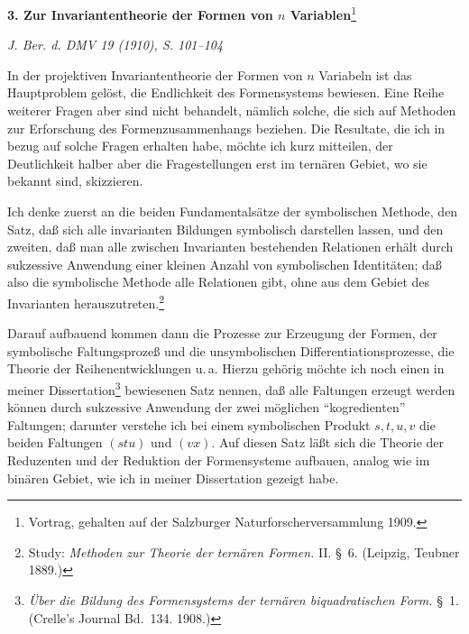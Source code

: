 \documentclass[12pt,a4paper]{article}
\begin{document}
\renewenvironment{noetherpaper}[4]{\newpage\section*{#1}\addcontentsline{toc}{section}{#1}\par\smallskip}{\par\medskip}




\begin{center}
\textbf{3. Zur Invariantentheorie der Formen von $n$ Variablen}\footnote{Vortrag, gehalten auf der Salzburger Naturforscherversammlung 1909.}

\smallskip
\textit{J. Ber. d. DMV 19 (1910), S. 101--104}
\end{center}

\smallskip

In der projektiven Invariantentheorie der Formen von $n$ Variabeln ist das Hauptproblem gelöst, die Endlichkeit des Formensystems bewiesen. Eine Reihe weiterer Fragen aber sind nicht behandelt, nämlich solche, die sich auf Methoden zur Erforschung des Formenzusammenhangs beziehen. Die Resultate, die ich in bezug auf solche Fragen erhalten habe, möchte ich kurz mitteilen, der Deutlichkeit halber aber die Fragestellungen erst im ternären Gebiet, wo sie bekannt sind, skizzieren.

Ich denke zuerst an die beiden Fundamentalsätze der symbolischen Methode, den Satz, daß sich alle invarianten Bildungen symbolisch darstellen lassen, und den zweiten, daß man alle zwischen Invarianten bestehenden Relationen erhält durch sukzessive Anwendung einer kleinen Anzahl von symbolischen Identitäten; daß also die symbolische Methode alle Relationen gibt, ohne aus dem Gebiet des Invarianten herauszutreten.\footnote{Study: \textit{Methoden zur Theorie der ternären Formen.} II. \S\ 6. (Leipzig, Teubner 1889.)}

Darauf aufbauend kommen dann die Prozesse zur Erzeugung der Formen, der symbolische Faltungsprozeß und die unsymbolischen Differentiationsprozesse, die Theorie der Reihenentwicklungen u.\,a. Hierzu gehörig möchte ich noch einen in meiner Dissertation\footnote{\textit{Über die Bildung des Formensystems der ternären biquadratischen Form.} \S\ 1. (Crelle's Journal Bd.~134. 1908.)} bewiesenen Satz nennen, daß alle Faltungen erzeugt werden können durch sukzessive Anwendung der zwei möglichen ``kogredienten'' Faltungen; darunter verstehe ich bei einem symbolischen Produkt $s,t,u,v$ die beiden Faltungen $(stu)$ und $(vx)$. Auf diesen Satz läßt sich die Theorie der Reduzenten und der Reduktion der Formensysteme aufbauen, analog wie im binären Gebiet, wie ich in meiner Dissertation gezeigt habe.
\end{document}
